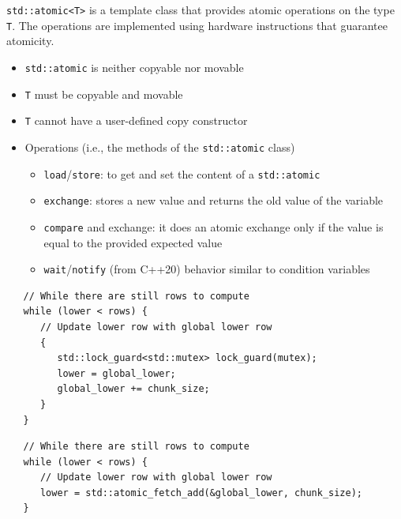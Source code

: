 \lstinline|std::atomic<T>| is a template class that provides atomic operations on the type \lstinline|T|. The operations are implemented using hardware instructions that guarantee atomicity.\\
\begin{itemize}
	\item \lstinline|std::atomic| is neither copyable nor movable
	\item \lstinline|T| must be copyable and movable
	\item \lstinline|T| cannot have a user-defined copy constructor
	\item Operations (i.e., the methods of the \lstinline|std::atomic| class)
	      \begin{itemize}
		      \item \lstinline|load|/\lstinline|store|: to get and set the content of a \lstinline|std::atomic|
		      \item \lstinline|exchange|: stores a new value and returns the old value
		            of the variable
		      \item \lstinline|compare| and exchange: it does an atomic exchange
		            only if the value is equal to the provided expected value
		      \item \lstinline|wait|/\lstinline|notify| (from C++20) behavior similar to condition
		            variables
	      \end{itemize}
\end{itemize}

\begin{paracol}{2}
   \begin{lstlisting}
   // While there are still rows to compute
   while (lower < rows) {
      // Update lower row with global lower row
      {
         std::lock_guard<std::mutex> lock_guard(mutex);
         lower = global_lower;
         global_lower += chunk_size;
      }
   }
   \end{lstlisting}
   
   \switchcolumn
   
   \begin{lstlisting}
   // While there are still rows to compute
   while (lower < rows) {
      // Update lower row with global lower row
      lower = std::atomic_fetch_add(&global_lower, chunk_size);
   }
   \end{lstlisting}

\end{paracol}

